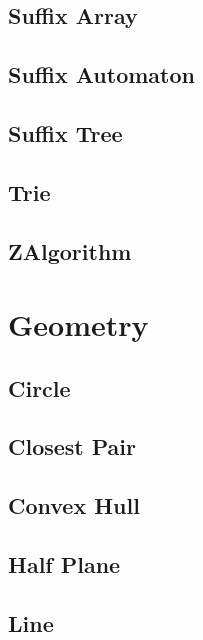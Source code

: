 \subsection{Suffix Array}
\raggedbottom
\hrulefill
\subsection{Suffix Automaton}
\raggedbottom
\hrulefill
\subsection{Suffix Tree}
\raggedbottom
\hrulefill
\subsection{Trie}
\raggedbottom
\hrulefill
\subsection{ZAlgorithm}
\raggedbottom
\hrulefill
\newpage

\section{Geometry}
\subsection{Circle}
\raggedbottom
\hrulefill
\subsection{Closest Pair}
\raggedbottom
\hrulefill
\subsection{Convex Hull}
\raggedbottom
\hrulefill
\subsection{Half Plane}
\raggedbottom
\hrulefill
\subsection{Line}
\raggedbottom
\hrulefill
